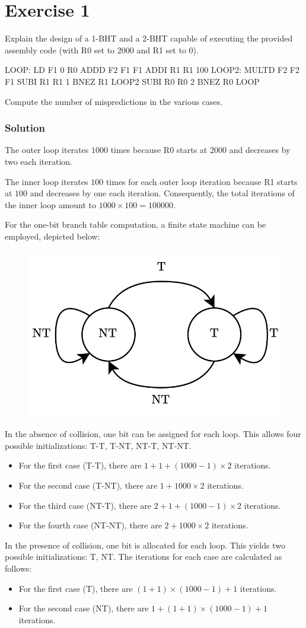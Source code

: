 \section{Exercise 1}

Explain the design of a 1-BHT and a 2-BHT capable of executing the provided assembly code (with R0 set to 2000 and R1 set to 0).
\begin{verbnobox}[\verbarg]
LOOP:   LD F1 0 R0
        ADDD F2 F1 F1
        ADDI R1 R1 100
LOOP2:  MULTD F2 F2 F1
        SUBI R1 R1 1
        BNEZ R1 LOOP2
        SUBI R0 R0 2
        BNEZ R0 LOOP
\end{verbnobox}
Compute the number of mispredictions in the various cases. 

\subsubsection*{Solution}
The outer loop iterates $1000$ times because R0 starts at $2000$ and decreases by two each iteration.

The inner loop iterates $100$ times for each outer loop iteration because R1 starts at $100$ and decreases by one each iteration. 
Consequently, the total iterations of the inner loop amount to $1000 \times 100 = 100000$.

For the one-bit branch table computation, a finite state machine can be employed, depicted below:
\begin{figure}[H]
    \centering
    \includegraphics[width=0.4\linewidth]{images/1bht.png}
\end{figure}

In the absence of collision, one bit can be assigned for each loop. This allows four possible initializations: T-T, T-NT, NT-T, NT-NT.
\begin{itemize}
    \item For the first case (T-T), there are $1 + 1 + (1000-1) \times 2$ iterations.
    \item For the second case (T-NT), there are $1 + 1000 \times 2$ iterations.
    \item For the third case (NT-T), there are $2 + 1 + (1000-1) \times 2$ iterations.
    \item For the fourth case (NT-NT), there are $2 + 1000 \times 2$ iterations.
\end{itemize}
In the presence of collision, one bit is allocated for each loop. 
This yields two possible initializations: T, NT.
The iterations for each case are calculated as follows:
\begin{itemize}
    \item For the first case (T), there are $(1+1) \times (1000-1) + 1$ iterations.
    \item For the second case (NT), there are $1 + (1+1) \times (1000-1) + 1$ iterations.
\end{itemize}

